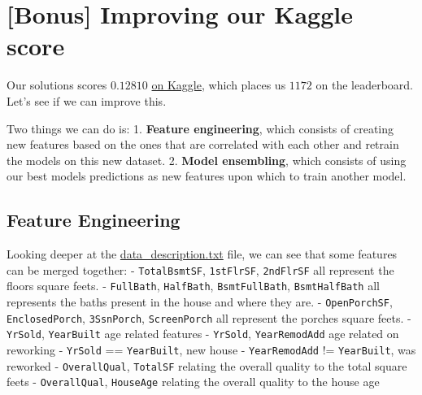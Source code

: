 \documentclass[11pt]{article}
\begin{document}
    \section{{[}Bonus{]} Improving our Kaggle
score}\label{bonus-improving-our-kaggle-score}

    Our solutions scores \(0.12810\)
\href{https://www.kaggle.com/competitions/house-prices-advanced-regression-techniques/leaderboard\#}{on
Kaggle}, which places us \(1172\) on the leaderboard. Let's see if we
can improve this.

Two things we can do is: 1. \textbf{Feature engineering}, which consists
of creating new features based on the ones that are correlated with each
other and retrain the models on this new dataset. 2. \textbf{Model
ensembling}, which consists of using our best models predictions as new
features upon which to train another model.

    \subsection{Feature Engineering}\label{feature-engineering}

    Looking deeper at the
\href{./data/data_description.txt}{data\_description.txt} file, we can
see that some features can be merged together: - \texttt{TotalBsmtSF},
\texttt{1stFlrSF}, \texttt{2ndFlrSF} all represent the floors square
feets. - \texttt{FullBath}, \texttt{HalfBath}, \texttt{BsmtFullBath},
\texttt{BsmtHalfBath} all represents the baths present in the house and
where they are. - \texttt{OpenPorchSF}, \texttt{EnclosedPorch},
\texttt{3SsnPorch}, \texttt{ScreenPorch} all represent the porches
square feets. - \texttt{YrSold}, \texttt{YearBuilt} age related features
- \texttt{YrSold}, \texttt{YearRemodAdd} age related on reworking -
\texttt{YrSold} == \texttt{YearBuilt}, new house - \texttt{YearRemodAdd}
!= \texttt{YearBuilt}, was reworked - \texttt{OverallQual},
\texttt{TotalSF} relating the overall quality to the total square feets
- \texttt{OverallQual}, \texttt{HouseAge} relating the overall quality
to the house age
\end{document}
